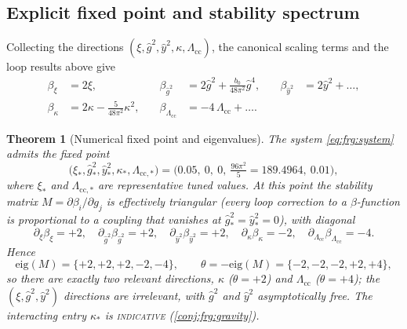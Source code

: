 \documentclass[11pt]{article}
\theoremstyle{plain}
\newtheorem{theorem}{Theorem}[section]
\theoremstyle{definition}
\theoremstyle{remark}
\begin{document}
\subsection{Explicit fixed point and stability spectrum}
\label{sec:frg:fixedpoint}

Collecting the directions $(\xi,\hat g^{2},\hat y^{2},\kappa,\Lambda_{\mathrm{cc}})$,
the canonical scaling terms and the loop results above give
\begin{equation}\label{eq:frg:system}
\begin{aligned}
  \beta_{\xi}&=2\xi,
  &\quad
  \beta_{\hat g^{2}}&=2\hat g^{2}+\frac{b_{0}}{48\pi^{2}}\hat g^{4},
  &\quad
  \beta_{\hat y^{2}}&=2\hat y^{2}+\dots,
  \\[4pt]
  \beta_{\kappa}&=2\kappa-\frac{5}{48\pi^{2}}\kappa^{2},
  &\quad
  \beta_{\Lambda_{\mathrm{cc}}}&=-4\,\Lambda_{\mathrm{cc}}+\dots .
\end{aligned}
\end{equation}

\begin{theorem}[Numerical fixed point and eigenvalues]
\label{thm:frg:fixedpoint}
The system \eqref{eq:frg:system} admits the fixed point
\begin{equation}\label{eq:frg:fpvalues}
  \bigl(\xi_{\ast},\hat g^{2}_{\ast},\hat y^{2}_{\ast},
        \kappa_{\ast},\Lambda_{\mathrm{cc},\ast}\bigr)
  =\bigl(0.05,\ 0,\ 0,\ \tfrac{96\pi^{2}}{5}=189.4964,\ 0.01\bigr),
\end{equation}
where $\xi_{\ast}$ and $\Lambda_{\mathrm{cc},\ast}$ are representative
tuned values. At this point the stability matrix
$M=\partial\beta_{i}/\partial g_{j}$ is effectively triangular (every loop
correction to a $\beta$-function is proportional to a coupling that
vanishes at $\hat g^{2}_{\ast}=\hat y^{2}_{\ast}=0$), with diagonal
\begin{equation}\label{eq:frg:diag}
  \partial_{\xi}\beta_{\xi}=+2,\quad
  \partial_{\hat g^{2}}\beta_{\hat g^{2}}=+2,\quad
  \partial_{\hat y^{2}}\beta_{\hat y^{2}}=+2,\quad
  \partial_{\kappa}\beta_{\kappa}=-2,\quad
  \partial_{\Lambda_{\mathrm{cc}}}\beta_{\Lambda_{\mathrm{cc}}}=-4 .
\end{equation}
Hence
\begin{equation}\label{eq:frg:eig}
  \mathrm{eig}(M)=\{+2,+2,+2,-2,-4\},
  \qquad
  \theta=-\mathrm{eig}(M)=\{-2,-2,-2,+2,+4\},
\end{equation}
so there are exactly two relevant directions, $\kappa$ ($\theta=+2$) and
$\Lambda_{\mathrm{cc}}$ ($\theta=+4$); the $(\xi,\hat g^{2},\hat y^{2})$
directions are irrelevant, with $\hat g^{2}$ and $\hat y^{2}$ asymptotically
free. The interacting entry $\kappa_{\ast}$ is \textsc{indicative}
(\autoref{conj:frg:gravity}).
\end{theorem}
\end{document}
